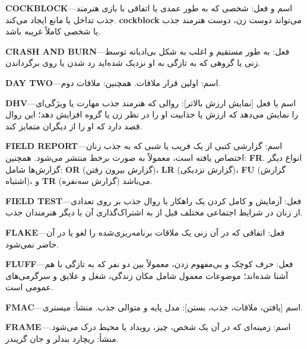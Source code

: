 \textbf{COCKBLOCK}—اسم و فعل: شخصی که به طور عمدی یا اتفاقی با بازی هنرمند جذب تداخل یا مانع ایجاد می‌کند. \textbf{cockblock} می‌تواند دوست زن، دوست هنرمند جذب یا شخصی کاملاً غریبه باشد.

\textbf{CRASH AND BURN}—فعل: به طور مستقیم و اغلب به شکل بی‌ادبانه توسط زنی یا گروهی که به تازگی به او نزدیک شده‌اید رد شدن یا روی برگرداندن.

\textbf{DAY TWO}—اسم: اولین قرار ملاقات. همچنین: ملاقات دوم.

\textbf{DHV}—اسم یا فعل [نمایش ارزش بالاتر]: روالی که هنرمند جذب مهارت یا ویژگی‌ای را نمایش می‌دهد که ارزش یا جذابیت او را در نظر زن یا گروه افزایش دهد؛ این روال قصد دارد که او را از دیگران متمایز کند.

\textbf{FIELD REPORT}—اسم: گزارشی کتبی از یک فریب یا شبی که به جذب زنان اختصاص یافته است، معمولاً به صورت برخط منتشر می‌شود. همچنین: \textbf{FR}. انواع دیگر گزارش‌ها شامل: \textbf{OR} (گزارش بیرون رفتن)، \textbf{LR} (گزارش نزدیکی)، \textbf{FU} (گزارش اشتباه)، و \textbf{TR} (گزارش سه‌نفره) می‌باشد.

\textbf{FIELD TEST}—فعل: آزمایش و کامل کردن یک راهکار یا روال جذب بر روی تعدادی از زنان در شرایط اجتماعی مختلف قبل از به اشتراک‌گذاری آن با دیگر هنرمندان جذب.

\textbf{FLAKE}—فعل: اتفاقی که در آن زنی یک ملاقات برنامه‌ریزی‌شده را لغو یا در آن حاضر نمی‌شود.

\textbf{FLUFF}—فعل: حرف کوچک و بی‌مفهوم زدن، معمولاً بین دو نفر که به تازگی با هم آشنا شده‌اند؛ موضوعات معمول شامل مکان زندگی، شغل و علایق و سرگرمی‌های عمومی است.

\textbf{FMAC}—اسم [یافتن، ملاقات، جذب، بستن]: مدل پایه و متوالی جذب. منشأ: میستری.

\textbf{FRAME}—اسم: زمینه‌ای که در آن یک شخص، چیز، رویداد یا محیط درک می‌شود. منشأ: ریچارد بندلر و جان گریندر.